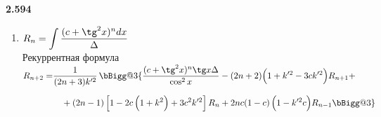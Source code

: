 \documentclass[a4paper,10pt]{article}
\makeatletter
\newcommand{\vast}{\bBigg@{3}}
\makeatother
\begin{document}
\vspace{-0.3em}
\hspace{-0.2em}
\textbf{2.594}
\vspace{-0.5em}
\begin{enumerate}
	\item 
		$
			R_n = \displaystyle\int \frac{(c + \tg^2x)^n dx}\Delta
		$\\[3pt]
		Рекуррентная формула\\[-1.2pt]
		
		\hspace{9mm}$
			\begin{aligned}
				R_{n+2} = & \frac1{(2n + 3)k'^2} \,\vast\{ { \frac{(c + \tg^2x)^n\tg x \Delta}{\cos^2x} - (2n + 2) \Bigl( 1 + k'^2 - 3ck'^2 \Bigr) R_{n+1} + }\\[6pt]
				& \quad + (2n - 1)\,\Bigl[ 1 - 2c \, \Bigl( 1 + k^2 \Bigr) + 3c^2k'^2 \Bigr]\, R_n + 2nc(1 - c)\, \Bigl( 1 - k'^2c \Bigr) R_{n-1} \vast\}
			\end{aligned}
		$
\end{enumerate}
\end{document}
